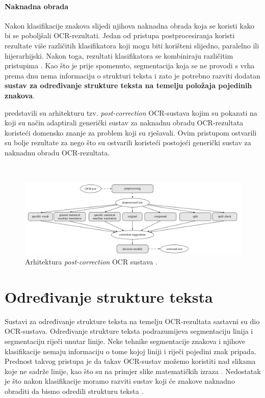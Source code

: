 \documentclass[times, utf8, zavrsni]{fer}
\begin{document}
\subsubsection{Naknadna obrada}
Nakon klasifikacije znakova slijedi njihova naknadna obrada koja se koristi kako
bi se poboljšali OCR-rezultati. Jedan od pristupa postprocesiranja koristi
rezultate više različitih klasifikatora koji mogu biti korišteni slijedno,
paralelno ili hijerarhijski. Nakon toga, rezultati klasifikatora se kombiniraju
različitim pristupima \citep{DBLP:journals/corr/abs-1710-05703}. Kao što je
prije spomenuto, segmentacija koja se ne provodi s vrha
prema dnu nema informaciju o strukturi teksta i zato je potrebno razviti dodatan
\textbf{sustav za određivanje strukture teksta na temelju položaja pojedinih
znakova}.

\citep{schulz2017multi} predstavili su arhitekturu
tzv. \emph{post-correction} OCR-sustava kojim su pokazati na koji su način
adaptirali generički sustav za naknadnu obradu OCR-rezultata koristeći domensko
znanje za problem koji su rješavali. Ovim pristupom ostvarili su bolje
rezultate za nego što su ostvarili koristeći postojeći
generički sustav za naknadnu obradu OCR-rezultata.

\

\begin{figure}[htb]
    \centering
    \includegraphics[width=\textwidth]{images/post-correction-example-01.png}
    \caption{
        Arhitektura \emph{post-correction} OCR sustava \citep{schulz2017multi}.
    }
    \label{fig:post-correction-example-01}
\end{figure}
















\chapter{Određivanje strukture teksta}
Sustavi za određivanje strukture teksta na temelju OCR-rezultata sastavni su
dio OCR-sustava. Određivanje strukture teksta podrazumijeva segmentaciju linija
i segmentaciju riječi unutar linije. Neke tehnike segmentacije znakova i
njihove klasifikacije nemaju informaciju o tome kojoj liniji i riječi pojedini
znak pripada. Prednost takvog pristupa je da takav OCR-sustav možemo koristiti
nad slikama koje ne sadrže linije, kao što su na primjer slike matematičkih
izraza \citep{Jurin:2017:Master}. Nedostatak je što nakon klasifikacije moramo
razviti sustav koji će znakove naknadno obraditi da bismo odredili strukturu
teksta \citep{Jurin:2017:Master}.
\end{document}
